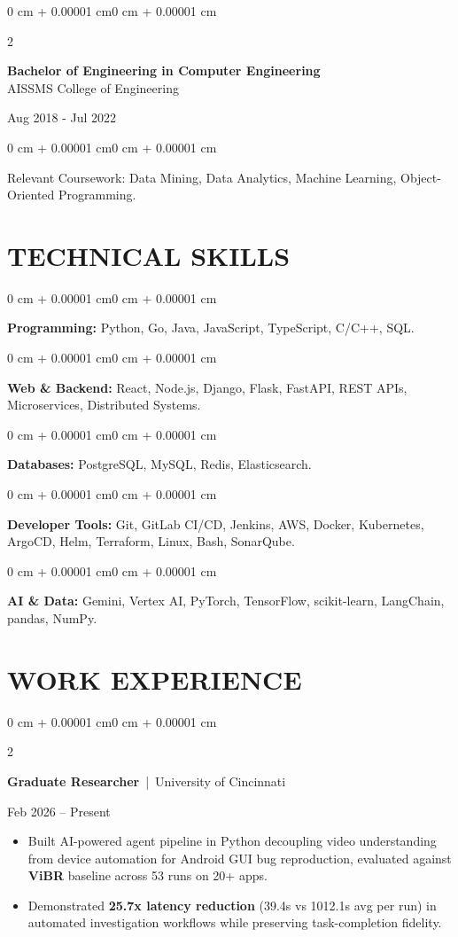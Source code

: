 \documentclass[10pt, letterpaper]{article}
\newenvironment{highlights}{
    \begin{itemize}[
        topsep=0.10 cm,
        parsep=0.06 cm,
        partopsep=0pt,
        itemsep=0.06 cm,
        leftmargin=12pt
    ]
}{
    \end{itemize}
}
\newenvironment{onecolentry}{
    \begin{adjustwidth}{0 cm + 0.00001 cm}{0 cm + 0.00001 cm}
}{
    \end{adjustwidth}
}
\newenvironment{twocolentry}[2][]{
    \onecolentry
    \def\secondColumn{#2}
    \setcolumnwidth{\fill, 4.5 cm}
    \begin{paracol}{2}
}{
    \switchcolumn \raggedleft \secondColumn
    \end{paracol}
    \endonecolentry
}
\begin{document}
\begin{twocolentry}{
    Aug 2018 - Jul 2022
}
    \textbf{Bachelor of Engineering in Computer Engineering} \\
    AISSMS College of Engineering
\end{twocolentry}
\begin{onecolentry}
Relevant Coursework: Data Mining, Data Analytics, Machine Learning, Object-Oriented Programming.
\end{onecolentry}
\section{TECHNICAL SKILLS}
\begin{onecolentry}
\textbf{Programming:} Python, Go, Java, JavaScript, TypeScript, C/C++, SQL.
\end{onecolentry}
\vspace{0.06 cm}
\begin{onecolentry}
\textbf{Web \& Backend:} React, Node.js, Django, Flask, FastAPI, REST APIs, Microservices, Distributed Systems.
\end{onecolentry}
\vspace{0.06 cm}
\begin{onecolentry}
\textbf{Databases:} PostgreSQL, MySQL, Redis, Elasticsearch.
\end{onecolentry}
\vspace{0.06 cm}
\begin{onecolentry}
\textbf{Developer Tools:} Git, GitLab CI/CD, Jenkins, AWS, Docker, Kubernetes, ArgoCD, Helm, Terraform, Linux, Bash, SonarQube.
\end{onecolentry}
\vspace{0.06 cm}
\begin{onecolentry}
\textbf{AI \& Data:} Gemini, Vertex AI, PyTorch, TensorFlow, scikit-learn, LangChain, pandas, NumPy.
\end{onecolentry}

\section{WORK EXPERIENCE}
\begin{twocolentry}{Feb 2026 -- Present}
\textbf{Graduate Researcher} \,|\, University of Cincinnati
\end{twocolentry}
\begin{highlights}
  \item Built AI-powered agent pipeline in Python decoupling video understanding from device automation for Android GUI bug reproduction, evaluated against \textbf{ViBR} baseline across 53 runs on 20+ apps.
  \item Demonstrated \textbf{25.7x latency reduction} (39.4s vs 1012.1s avg per run) in automated investigation workflows while preserving task-completion fidelity.
\end{highlights}
\end{document}
